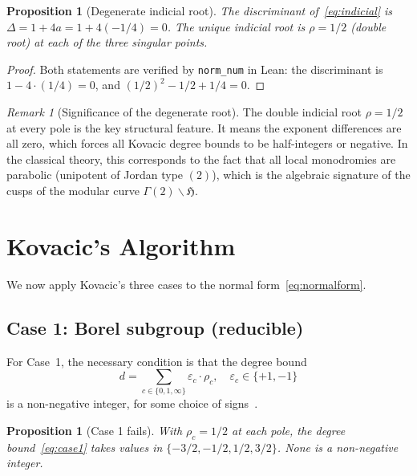 \documentclass[11pt]{article}
\theoremstyle{plain}
\newtheorem{proposition}[theorem]{Proposition}
\theoremstyle{definition}
\theoremstyle{remark}
\newtheorem{remark}[theorem]{Remark}
\begin{document}
\begin{proposition}[Degenerate indicial root]\label{prop:indicial}
The discriminant of~\eqref{eq:indicial} is $\Delta = 1 + 4a = 1 + 4(-1/4) = 0$.
The unique indicial root is $\rho = 1/2$ (double root) at each of the three singular points.
\end{proposition}

\begin{proof}
Both statements are verified by \texttt{norm\_num} in Lean: the discriminant is $1 - 4 \cdot (1/4) = 0$, and $(1/2)^2 - 1/2 + 1/4 = 0$.
\end{proof}

\begin{remark}[Significance of the degenerate root]
The double indicial root $\rho = 1/2$ at every pole is the key structural feature.
It means the exponent differences are all zero, which forces all Kovacic degree bounds to be half-integers or negative.
In the classical theory, this corresponds to the fact that all local monodromies are parabolic (unipotent of Jordan type $(2)$), which is the algebraic signature of the cusps of the modular curve $\Gamma(2) \backslash \mathfrak{H}$.
\end{remark}

\section{Kovacic's Algorithm}
\label{sec:kovacic}

We now apply Kovacic's three cases to the normal form~\eqref{eq:normalform}.

\subsection{Case 1: Borel subgroup (reducible)}

For Case~1, the necessary condition is that the degree bound
\begin{equation}\label{eq:case1}
  d = \sum_{c \in \{0,1,\infty\}} \varepsilon_c \cdot \rho_c, \quad \varepsilon_c \in \{+1, -1\}
\end{equation}
is a non-negative integer, for some choice of signs~\cite{Kovacic1986,Singer2009}.

\begin{proposition}[Case 1 fails]\label{prop:case1}
With $\rho_c = 1/2$ at each pole, the degree bound~\eqref{eq:case1} takes values in $\{-3/2, -1/2, 1/2, 3/2\}$.
None is a non-negative integer.
\end{proposition}
\end{document}
